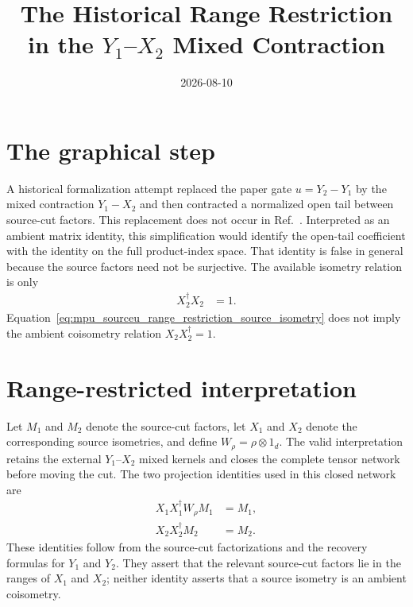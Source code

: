 \documentclass{article}
\title{The Historical Range Restriction in the $Y_1$--$X_2$ Mixed Contraction}
\author{}
\date{2026-08-10}
\begin{document}
\maketitle
{}

\section{The graphical step}

A historical formalization attempt replaced the paper gate
$u=Y_2\mathbin{-}Y_1$ by the mixed contraction $Y_1\mathbin{-}X_2$ and then
contracted a normalized open tail between source-cut factors. This replacement
does not occur in Ref.~\cite[lines~536--557]{Cirac2017MPU}. Interpreted
as an ambient matrix identity, this simplification would identify the
open-tail coefficient with the identity on the full product-index space. That
identity is false in general because the source factors need not be
surjective. The available isometry relation is only
\begin{align}
    X_2^\dagger X_2
        &= 1.
    \label{eq:mpu_sourceu_range_restriction_source_isometry}
\end{align}
Equation~\ref{eq:mpu_sourceu_range_restriction_source_isometry} does not imply
the ambient coisometry relation $X_2X_2^\dagger=1$.

\section{Range-restricted interpretation}

Let $M_1$ and $M_2$ denote the source-cut factors, let $X_1$ and $X_2$ denote
the corresponding source isometries, and define
$W_\rho=\rho\otimes 1_d$. The valid interpretation retains the external
$Y_1$--$X_2$ mixed kernels and closes the complete tensor network before
moving the cut. The two projection identities used in this closed network are
\begin{align}
    X_1X_1^\dagger W_\rho M_1
        &= M_1,
    \label{eq:mpu_sourceu_range_restriction_first_range_identity}\\
    X_2X_2^\dagger M_2
        &= M_2.
    \label{eq:mpu_sourceu_range_restriction_second_range_identity}
\end{align}
These identities follow from the source-cut factorizations and the recovery
formulas for $Y_1$ and $Y_2$. They assert that the relevant source-cut factors
lie in the ranges of $X_1$ and $X_2$; neither identity asserts that a source
isometry is an ambient coisometry.
\end{document}
